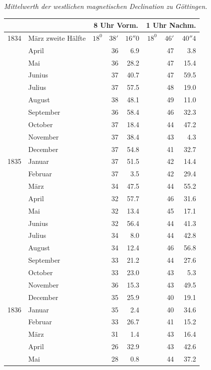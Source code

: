 \begin{center}\textit{Mittelwerth der westlichen magnetischen Declination zu Göttingen.}\end{center}
\begin{center}\small
\begin{tabular}{rl|rrr|rrr}
&&\multicolumn{3}{c|}{8 Uhr Vorm.}&\multicolumn{3}{c}{1 Uhr Nachm.}\\\hline
1834&März zweite Hälfte&$18^0$&$38'$&$16''0$&$18^0$&$46'$&$40''4$\\
&April&&36&6.9&&47&3.8\\
&Mai&&36&28.2&&47&15.4\\
&Junius&&37&40.7&&47&59.5\\
&Julius&&37&57.5&&48&19.0\\
&August&&38&48.1&&49&11.0\\
&September&&36&58.4&&46&32.3\\
&October&&37&18.4&&44&47.2\\
&November&&37&38.4&&43&4.3\\
&December&&37&54.8&&41&32.7\\[4pt]
1835&Januar&&37&51.5&&42&14.4\\
&Februar&&37&3.5&&42&29.4\\
&März&&34&47.5&&44&55.2\\
&April&&32&57.7&&46&31.6\\
&Mai&&32&13.4&&45&17.1\\
&Junius&&32&56.4&&44&41.3\\
&Julius&&34&8.0&&44&42.8\\
&August&&34&12.4&&46&56.8\\
&September&&33&21.2&&44&27.6\\
&October&&33&23.0&&43&5.3\\
&November&&36&15.3&&43&49.5\\
&December&&35&25.9&&40&19.1\\[4pt]
1836&Januar&&35&2.4&&40&34.6\\
&Februar&&33&26.7&&41&15.2\\
&März&&31&1.4&&43&16.4\\
&April&&26&32.9&&43&42.6\\
&Mai&&28&0.8&&44&37.2
\end{tabular}
\end{center}
